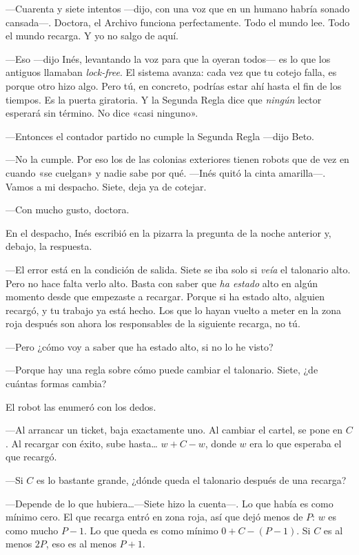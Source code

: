 ---Cuarenta y siete intentos ---dijo, con una voz que en un humano habría sonado cansada---\nobreak. Doctora, el Archivo funciona perfectamente. Todo el mundo lee. Todo el mundo recarga. Y yo no salgo de aquí.

---Eso ---dijo Inés, levantando la voz para que la oyeran todos--- es lo que los antiguos llamaban \emph{lock-free}. El sistema avanza: cada vez que tu cotejo falla, es porque otro hizo algo. Pero tú, en concreto, podrías estar ahí hasta el fin de los tiempos. Es la puerta giratoria. Y la Segunda Regla dice que \emph{ningún} lector esperará sin término. No dice «casi ninguno».

---Entonces el contador partido no cumple la Segunda Regla ---dijo Beto.

---No la cumple. Por eso los de las colonias exteriores tienen robots que de vez en cuando «se cuelgan» y nadie sabe por qué. ---Inés quitó la cinta amarilla---\nobreak. Vamos a mi despacho. Siete, deja ya de cotejar.

---Con mucho gusto, doctora.

\escena
En el despacho, Inés escribió en la pizarra la pregunta de la noche anterior y, debajo, la respuesta.

---El error está en la condición de salida. Siete se iba solo si \emph{veía} el talonario alto. Pero no hace falta verlo alto. Basta con saber que \emph{ha estado} alto en algún momento desde que empezaste a recargar. Porque si ha estado alto, alguien recargó, y tu trabajo ya está hecho. Los que lo hayan vuelto a meter en la zona roja después son ahora los responsables de la siguiente recarga, no tú.

---Pero ¿cómo voy a saber que ha estado alto, si no lo he visto?

---Porque hay una regla sobre cómo puede cambiar el talonario. Siete, ¿de cuántas formas cambia?

El robot las enumeró con los dedos.

---Al arrancar un ticket, baja exactamente uno. Al cambiar el cartel, se pone en $C$. Al recargar con éxito, sube hasta\ldots{} $w + C - w$, donde $w$ era lo que esperaba el que recargó.

---Si $C$ es lo bastante grande, ¿dónde queda el talonario después de una recarga?

---Depende de lo que hubiera\ldots ---Siete hizo la cuenta---\nobreak. Lo que había es como mínimo cero. El que recarga entró en zona roja, así que dejó menos de $P$: $w$ es como mucho $P-1$. Lo que queda es como mínimo $0 + C - (P-1)$. Si $C$ es al menos $2P$, eso es al menos $P+1$.

